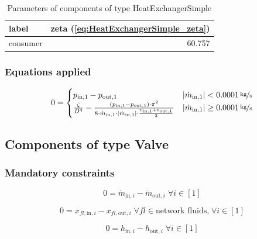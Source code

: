 \begin{table}[H]\begin{center}
\begin{tabular}{lr}
\toprule
    label &  zeta (\ref{eq:HeatExchangerSimple_zeta}) \\
\midrule
 consumer &                                    60.757 \\
\bottomrule
\end{tabular}
\caption{Parameters of components of type HeatExchangerSimple}
\end{center}\end{table}

\subsubsection{Equations applied}

\begin{equation}
\label{eq:HeatExchangerSimple_zeta}
0 = \begin{cases}
p_\mathrm{in,1}- p_\mathrm{out,1} & |\dot{m}_\mathrm{in,1}| < \unitfrac[0.0001]{kg}{s} \\
\frac{\zeta}{D^4}-\frac{(p_\mathrm{in,1}-p_\mathrm{out,1})\cdot\pi^2}{8\cdot\dot{m}_\mathrm{in,1}\cdot|\dot{m}_\mathrm{in,1}|\cdot\frac{v_\mathrm{in,1} + v_\mathrm{out,1}}{2}}& |\dot{m}_\mathrm{in,1}| \geq \unitfrac[0.0001]{kg}{s}
\end{cases}
\end{equation}


\subsection{Components of type Valve}

\subsubsection{Mandatory constraints}

\begin{equation}
\label{eq:Valve_mass_flow_constraints}
0=\dot{m}_{\mathrm{in,}i}-\dot{m}_{\mathrm{out,}i}\; \forall i \in [1]
\end{equation}

\begin{equation}
\label{eq:Valve_fluid_constraints}
0=x_{fl\mathrm{,in,}i}-x_{fl\mathrm{,out,}i}\;\forall fl \in\text{network fluids,}\; \forall i \in [1]
\end{equation}

\begin{equation}
\label{eq:Valve_enthalpy_equality_constraints}
0=h_{\mathrm{in,}i}-h_{\mathrm{out,}i}\; \forall i \in [1]
\end{equation}


